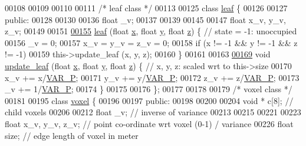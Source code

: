 \begin{DoxyCode}
00108 \textcolor{comment}{}
00109 
00110 
00111 \textcolor{comment}{/* leaf class */}
00113 
00125 \textcolor{keyword}{class }\hyperlink{classleaf}{leaf} \{
00126 
00127 \textcolor{keyword}{public}:
00128 
00130 
00136     \textcolor{keywordtype}{float} \_v;
00137 
00139 
00145 
00147     \textcolor{keywordtype}{float} x\_v, y\_v, z\_v;
00149 
00151 
\hypertarget{Voxel_8hpp_source.tex_l00155}{}\hyperlink{classleaf_aafe906fcbc78cef65683b3015de636bd}{00155}     \hyperlink{classleaf_aafe906fcbc78cef65683b3015de636bd}{leaf} (\textcolor{keywordtype}{float} \hyperlink{classquaternion_acdcda48f9dd7ff35873aae38fa33ab78}{x}, \textcolor{keywordtype}{float} \hyperlink{classquaternion_a48e3d1fbf5e12eb54985c32b45dd8303}{y}, \textcolor{keywordtype}{float} \hyperlink{classquaternion_a538598007238d399f79ddcecd39ef5cf}{z}) \{ \textcolor{comment}{// state = -1: unoccupied}
00156         \_v = 0;
00157         x\_v = y\_v = z\_v = 0;
00158         \textcolor{keywordflow}{if} (x != -1 && y != -1 && z != -1)
00159             this->update\_leaf (x, y, z);
00160     \}
00161 
00163 
\hypertarget{Voxel_8hpp_source.tex_l00169}{}\hyperlink{classleaf_adacc1e0d36163c7fd0a7c31576ecf4e8}{00169}     \textcolor{keywordtype}{void} \hyperlink{classleaf_adacc1e0d36163c7fd0a7c31576ecf4e8}{update\_leaf} (\textcolor{keywordtype}{float} \hyperlink{classquaternion_acdcda48f9dd7ff35873aae38fa33ab78}{x}, \textcolor{keywordtype}{float} \hyperlink{classquaternion_a48e3d1fbf5e12eb54985c32b45dd8303}{y}, \textcolor{keywordtype}{float} \hyperlink{classquaternion_a538598007238d399f79ddcecd39ef5cf}{z}) \{ \textcolor{comment}{// x, y, z: scaled wrt to this->size}
00170         x\_v += x/\hyperlink{Voxel_8hpp_ae1cd6283839fc3aebf9bccbd1044a365}{VAR\_P};
00171         y\_v += y/\hyperlink{Voxel_8hpp_ae1cd6283839fc3aebf9bccbd1044a365}{VAR\_P};
00172         z\_v += z/\hyperlink{Voxel_8hpp_ae1cd6283839fc3aebf9bccbd1044a365}{VAR\_P};
00173         \_v += 1/\hyperlink{Voxel_8hpp_ae1cd6283839fc3aebf9bccbd1044a365}{VAR\_P};
00174     \}
00175 
00176 \};
00177 
00178 
00179 \textcolor{comment}{/* voxel class */}
00181 
00195 \textcolor{keyword}{class }\hyperlink{classvoxel}{voxel} \{
00196 
00197 \textcolor{keyword}{public}:
00198 
00200 
00204     \textcolor{keywordtype}{void} * c[8]; \textcolor{comment}{// child voxels}
00206 \textcolor{comment}{}
00212     \textcolor{keywordtype}{float} \_v; \textcolor{comment}{// inverse of variance}
00213 
00215 
00221 
00223     \textcolor{keywordtype}{float} x\_v, y\_v, z\_v; \textcolor{comment}{// point co-ordinate wrt voxel (0-1) / variance}
00226 \textcolor{comment}{}    \textcolor{keywordtype}{float} size; \textcolor{comment}{// edge length of voxel in meter}

\end{DoxyCode}
